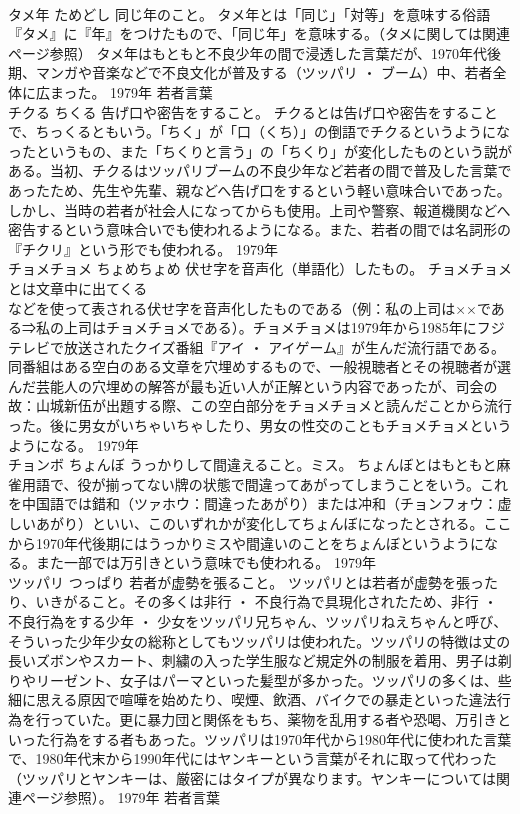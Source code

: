 \documentclass[8pt]{extreport}
\begin{document}
\begin{CJK}{UTF8}{min}
\\	タメ年	ためどし	同じ年のこと。	タメ年とは「同じ」「対等」を意味する俗語『タメ』に『年』をつけたもので、「同じ年」を意味する。（タメに関しては関連ページ参照） タメ年はもともと不良少年の間で浸透した言葉だが、1970年代後期、マンガや音楽などで不良文化が普及する（ツッパリ ・ ブーム）中、若者全体に広まった。	1979年	若者言葉	
\\	チクる	ちくる	告げ口や密告をすること。	チクるとは告げ口や密告をすることで、ちっくるともいう。「ちく」が「口（くち）」の倒語でチクるというようになったというもの、また「ちくりと言う」の「ちくり」が変化したものという説がある。当初、チクるはツッパリブームの不良少年など若者の間で普及した言葉であったため、先生や先輩、親などへ告げ口をするという軽い意味合いであった。しかし、当時の若者が社会人になってからも使用。上司や警察、報道機関などへ密告するという意味合いでも使われるようになる。また、若者の間では名詞形の『チクリ』という形でも使われる。	1979年	
\\	チョメチョメ	ちょめちょめ	伏せ字を音声化（単語化）したもの。	チョメチョメとは文章中に出てくる
\\	などを使って表される伏せ字を音声化したものである（例：私の上司は××である⇒私の上司はチョメチョメである）。チョメチョメは1979年から1985年にフジテレビで放送されたクイズ番組『アイ ・ アイゲーム』が生んだ流行語である。同番組はある空白のある文章を穴埋めするもので、一般視聴者とその視聴者が選んだ芸能人の穴埋めの解答が最も近い人が正解という内容であったが、司会の故：山城新伍が出題する際、この空白部分をチョメチョメと読んだことから流行った。後に男女がいちゃいちゃしたり、男女の性交のこともチョメチョメというようになる。	1979年	
\\	チョンボ	ちょんぼ	うっかりして間違えること。ミス。	ちょんぼとはもともと麻雀用語で、役が揃ってない牌の状態で間違ってあがってしまうことをいう。これを中国語では錯和（ツァホウ：間違ったあがり）または冲和（チョンフォウ：虚しいあがり）といい、このいずれかが変化してちょんぼになったとされる。ここから1970年代後期にはうっかりミスや間違いのことをちょんぼというようになる。また一部では万引きという意味でも使われる。	1979年	
\\	ツッパリ	つっぱり	若者が虚勢を張ること。	ツッパリとは若者が虚勢を張ったり、いきがること。その多くは非行 ・ 不良行為で具現化されたため、非行 ・ 不良行為をする少年 ・ 少女をツッパリ兄ちゃん、ツッパリねえちゃんと呼び、そういった少年少女の総称としてもツッパリは使われた。ツッパリの特徴は丈の長いズボンやスカート、刺繍の入った学生服など規定外の制服を着用、男子は剃りやリーゼント、女子はパーマといった髪型が多かった。ツッパリの多くは、些細に思える原因で喧嘩を始めたり、喫煙、飲酒、バイクでの暴走といった違法行為を行っていた。更に暴力団と関係をもち、薬物を乱用する者や恐喝、万引きといった行為をする者もあった。ツッパリは1970年代から1980年代に使われた言葉で、1980年代末から1990年代にはヤンキーという言葉がそれに取って代わった（ツッパリとヤンキーは、厳密にはタイプが異なります。ヤンキーについては関連ページ参照）。	1979年	若者言葉	

\end{CJK}
\end{document}
